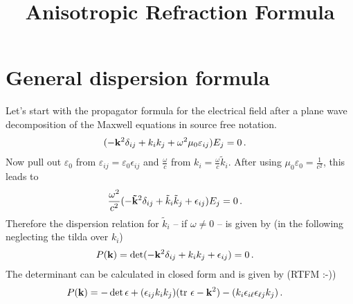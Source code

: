 \documentclass[a4paper,12pt]{article}
\title{Anisotropic Refraction Formula}
\newcommand{\vct}[1]{{\bf #1}}
\begin{document}
\maketitle

\section{General dispersion formula}

Let's start with the propagator formula for the electrical field after a plane wave decomposition of the Maxwell equations in
source free notation.
\begin{align}
 (-\vct{k}^2 \delta_{ij} + k_i k_j + \omega^2 \mu_0 \varepsilon_{ij}) E_j &= 0\,.
\end{align}
Now pull out $\varepsilon_0$ from $\varepsilon_{ij} = \varepsilon_0 \epsilon_{ij}$ and $\tfrac{\omega}{c}$ 
from $k_i = \tfrac{\omega}{c} \tilde{k}_i$. After using $\mu_0 \varepsilon_0 = \tfrac{1}{c^2}$, this leads to
\begin{align}
 \frac{\omega^2}{c^2} (-\vct{\tilde{k}}^2 \delta_{ij} + \tilde{k}_i \tilde{k}_j + \epsilon_{ij}) E_j &= 0\,.
\end{align}
Therefore the dispersion relation for $\tilde{k}_i$ -- if $\omega \ne 0$ -- is given by (in the following neglecting the tilda
over $k_i$)
\begin{align}
 P(\vct{k}) = \det(-\vct{k}^2 \delta_{ij} + k_i k_j + \epsilon_{ij}) &= 0\,.
\end{align}
The determinant can be calculated in closed form and is given by (RTFM :-))
\begin{align}
\label{eq:det}
 P(\vct{k}) &= -\det\epsilon + (\epsilon_{ij} k_i k_j)(\text{tr }\epsilon - \vct{k}^2) - (k_i \epsilon_{i\ell} \epsilon_{\ell j} k_j)\,.
\end{align}
\end{document}
